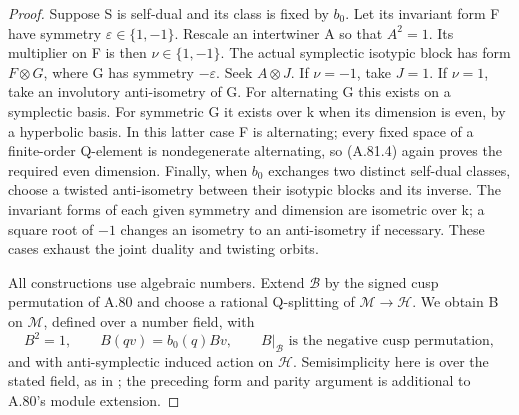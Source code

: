 \begin{proof}
Suppose S is self-dual and its class is fixed by \(b_0\).
Let its invariant form F have symmetry
\(\varepsilon\in\{1,-1\}\). Rescale an intertwiner A
so that \(A^2=1\). Its multiplier on F is then
\(\nu\in\{1,-1\}\). The actual symplectic isotypic
block has form \(F\otimes G\), where G has symmetry
\(-\varepsilon\). Seek \(A\otimes J\). If
\(\nu=-1\), take \(J=1\). If \(\nu=1\), take an
involutory anti-isometry of G. For alternating G this
exists on a symplectic basis. For symmetric G it exists
over k when its dimension is even, by a hyperbolic basis.
In this latter case F is alternating; every fixed space
of a finite-order Q-element is nondegenerate alternating,
so (A.81.4) again proves the required even dimension.
Finally, when \(b_0\) exchanges two distinct self-dual
classes, choose a twisted anti-isometry between their
isotypic blocks and its inverse. The invariant forms of
each given symmetry and dimension are isometric over k;
a square root of \(-1\) changes an isometry to an
anti-isometry if necessary. These cases exhaust the joint
duality and twisting orbits.

All constructions use algebraic numbers. Extend
\(\mathscr B\) by the signed cusp permutation of A.80
and choose a rational Q-splitting of
\(\mathscr M\to\mathscr H\). We obtain B on
\(\mathscr M\), defined over a number field, with
\[
 B^2=1,\qquad B(qv)=b_0(q)Bv,
 \qquad B|_{\mathscr B}\text{ is the negative cusp permutation},
 \tag{A.81.8}
\]
and with anti-symplectic induced action on \(\mathscr H\).
Semisimplicity here is over the stated field, as in
\citet[Theorem~7.4]{AMilne2025}; the preceding form and
parity argument is additional to A.80's module extension.


\end{proof}
